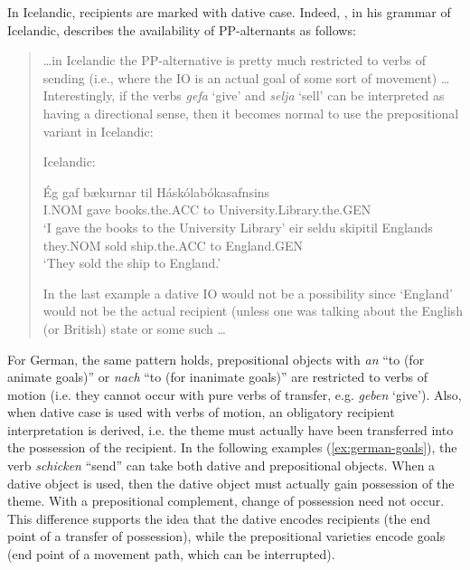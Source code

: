 	In Icelandic, recipients are marked with dative case. Indeed, \cite{Thrainsson.2007}, in his grammar of Icelandic, describes the availability of PP-alternants as follows: 
	\begin{quotation}
	\ldots in Icelandic the PP-alternative is pretty much restricted to verbs of sending (i.e., where the IO is an actual goal of some sort of movement) \ldots Interestingly, if the verbs \textit{gefa} `give' and \textit{selja} `sell' can be interpreted as having a directional sense, then it becomes normal to use the prepositional variant in Icelandic:
	\begin{exe}
		\ex Icelandic: \label{ex:icelandic-goals}
		\begin{xlist}
		\ex \gll \'{E}g gaf b\ae kurnar til H\'ask\'olab\'okasafnsins\\
		I.NOM gave books.the.ACC to University.Library.the.GEN\\
		\trans `I gave the books to the University Library'
		\ex \gll \th eir seldu skipi\dh  til Englands\\
		they.NOM sold ship.the.ACC to England.GEN\\
		\trans `They sold the ship to England.'
		\end{xlist}
	\end{exe}
	In the last example a dative IO would not be a possibility since `England' would not be the actual recipient (unless one was talking about the English (or British) state or some such \ldots \citep[fn 64]{Thrainsson.2007}
	\end{quotation}
	For German, the same pattern holds, prepositional objects with \textit{an} ``to (for animate goals)'' or \textit{nach} ``to (for inanimate goals)'' are restricted to verbs of motion (i.e. they cannot occur with pure verbs of transfer, e.g. \textit{geben} `give'). Also, when dative case is used with verbs of motion, an obligatory recipient interpretation is derived, i.e. the theme must actually have been transferred into the possession of the recipient. In the following examples (\ref{ex:german-goals}), the verb \textit{schicken} ``send'' can take both dative and prepositional objects. When a dative object is used, then the dative object must actually gain possession of the theme. With a prepositional complement, change of possession need not occur. This difference supports the idea that the dative encodes recipients (the end point of a transfer of possession), while the prepositional varieties encode goals (end point of a movement path, which can be interrupted).


